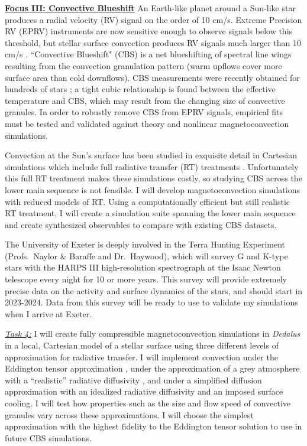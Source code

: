 \documentclass[12pt]{article}
\newcommand{\sct}[1]{\vspace{0.3cm}\hspace{-\parindent}\textbf{\underline{#1}}\hspace{0.3cm}}
\begin{document}
\sct{Focus III: Convective Blueshift}
An Earth-like planet around a Sun-like star produces a radial velocity (RV) signal on the order of 10 cm/s.
Extreme Precision RV (EPRV) instruments are now sensitive enough to observe signals below this threshold, but stellar surface convection produces RV signals much larger than 10 cm/s \citep{crass_etal_2021}.
``Convective Blueshift" (CBS) is a net blueshifting of spectral line wings resulting from the convection granulation pattern (warm upflows cover more surface area than cold downflows).
CBS measurements were recently obtained for hundreds of stars \citep{liebing_etal_2021}; a tight cubic relationship is found between the effective temperature and CBS, which may result from the changing size of convective granules. %
In order to robustly remove CBS from EPRV signals, empirical fits must be tested and validated against theory and nonlinear magnetoconvection simulations. 

Convection at the Sun's surface has been studied in exquisite detail in Cartesian simulations which include full radiative transfer (RT) treatments \citep[e.g.,][]{rempel2020, danilovic_etal_2022}.
Unfortunately this full RT treatment makes these simulations costly, so studying CBS across the lower main sequence is not feasible.
I will develop magnetoconvection simulations with reduced models of RT.
Using a computationally efficient but still realistic RT treatment, I will create a simulation suite spanning the lower main sequence and create synthesized observables to compare with existing CBS datasets.

The University of Exeter is deeply involved in the Terra Hunting Experiment (Profs.~Naylor \& Baraffe and Dr.~Haywood), which will survey G and K-type stars with the HARPS III high-resolution spectrograph at the Isaac Newton telescope every night for 10 or more years.
This survey will provide extremely precise data on the activity and surface dynamics of the stars, and should start in 2023-2024.
Data from this survey will be ready to use to validate my simulations when I arrive at Exeter.

\underline{\emph{Task 4:}} I will create fully compressible magnetoconvection simulations in \emph{Dedalus} in a local, Cartesian model of a stellar surface using three different levels of approximation for radiative transfer.
I will implement convection under the Eddington tensor approximation \citep[previously tested in \emph{Dedalus} in ref.][sct.~XI.G]{burns_etal_2020}, under the approximation of a grey atmosphere with a ``realistic'' radiative diffusivity \citep{barekat_brandenburg_2014}, and under a simplified diffusion approximation with an idealized radiative diffusivity and an imposed surface cooling.
I will test how properties such as the size and flow speed of convective granules vary across these approximations.
I will choose the simplest approximation with the highest fidelity to the Eddington tensor solution to use in future CBS simulations.
\end{document}
